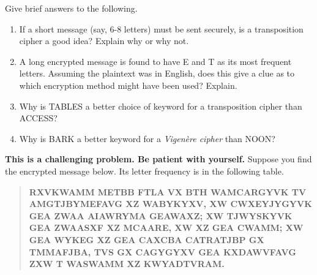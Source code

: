 \documentclass[11pt, oneside]{article}   	%
\begin{document}
 Give brief answers to the following.

\begin{enumerate}

\item 
  If a short message (say, 6-8 letters) must be sent securely, is a
  transposition cipher a good idea? Explain why or why not.


\item A long encrypted message is found to have E and T as its
  most frequent letters. Assuming the plaintext was in English, does
  this give a clue as to which encryption method might have been used?
  Explain.

\item Why is \textsf{TABLES} a better choice of keyword for a
  transposition cipher than \textsf{ACCESS}?

\item Why is {\textsf BARK} a better keyword for a
  \emph{Vigen\`ere cipher} than {\textsf NOON}?

\end{enumerate}

 \textbf{This is a challenging problem. Be patient with yourself.} Suppose you find the encrypted message below. Its letter frequency is in the following table. 
\begin{quote} \textbf{RXVKWAMM METBB FTLA VX BTH WAMCARGYVK TV AMGTJBYMEFAVG XZ WABYKYXV, XW CWXEYJYGYVK GEA ZWAA AIAWRYMA GEAWAXZ; XW TJWYSKYVK GEA ZWAASXF XZ MCAARE, XW XZ GEA CWAMM; XW GEA WYKEG XZ GEA CAXCBA CATRATJBP GX TMMAFJBA, TVS GX CAGYGYXV GEA KXDAWVFAVG ZXW T WASWAMM XZ KWYADTVRAM.} \end{quote}
	 
\end{document}
